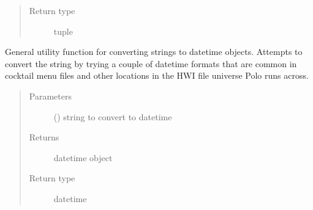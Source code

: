 \documentclass[letterpaper,10pt,english]{sphinxmanual}
\begin{document}
\begin{fulllineitems}
\begin{fulllineitems}
\begin{quote}
\begin{description}
\item[{Return type}] \leavevmode
tuple

\end{description}\end{quote}

\end{fulllineitems}


\begin{fulllineitems}
\label{\detokenize{polo.utils:polo.utils.io_utils.BarTender.datetime_converter}}
General utility function for converting strings to datetime objects.
Attempts to convert the string by trying a couple of datetime
formats that are common in cocktail menu files and other
locations in the HWI file universe Polo runs across.
\begin{quote}\begin{description}
\item[{Parameters}] \leavevmode
{} () \textendash{} string to convert to datetime

\item[{Returns}] \leavevmode
datetime object

\item[{Return type}] \leavevmode
datetime

\end{description}\end{quote}

\end{fulllineitems}



\end{fulllineitems}
\end{document}
